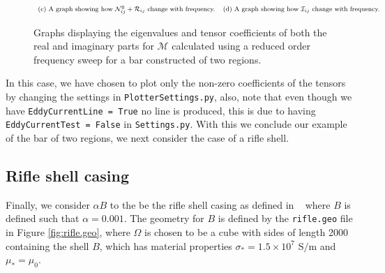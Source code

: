 \begin{figure}[H]
$$\begin{array}{cc}
\textrm{\footnotesize{(c) A graph showing how $\mathcal{N}^0_{ij}+\mathcal{R}_{ij}$ change with frequency.}} & \textrm{\footnotesize{(d) A graph showing how $\mathcal{I}_{ij}$ change with frequency.}}
\end{array}$$
\caption{Graphs displaying the eigenvalues and tensor coefficients of both the real and imaginary parts for $\mathcal{M}$ calculated using a reduced order frequency sweep for a bar constructed of two regions.}
\label{fig:DualBarOutputs}
\end{figure}
\noindent
In this case, we have chosen to plot only the non-zero coefficients of the tensors by changing the settings in \texttt{PlotterSettings.py}, also, note that even though we have \texttt{EddyCurrentLine = True} no line is produced, this is due to having \texttt{EddyCurrentTest = False} in \texttt{Settings.py}. With this we conclude our example of the bar of two regions, we next consider the case of a rifle shell.
\subsection{Rifle shell casing}\label{sectRifle}
Finally, we consider  $\alpha B$ to the be the rifle shell casing as defined in ~\cite{Rehim2015,LedgerLionheart2016} where $B$ is defined such that $\alpha=0.001$. The geometry for $B$ is defined by the \texttt{rifle.geo} file in Figure \ref{fig:rifle.geo}, where $\Omega$ is chosen to be a cube with sides of length 2000 containing the shell $B$, which has material properties $\sigma_*=1.5\times10^7\text{ S/m}$ and $\mu_*=\mu_0$.

